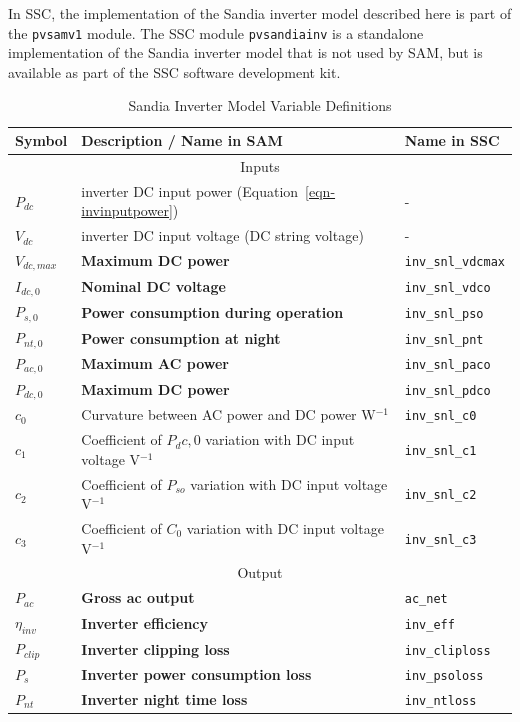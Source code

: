 \documentclass[12pt,letterpaper]{article}
\begin{document}
In SSC, the implementation of the Sandia inverter model described here is part of the \texttt{pvsamv1} module. The SSC module \texttt{pvsandiainv} is a standalone implementation of the Sandia inverter model that is not used by SAM, but is available as part of the SSC software development kit.

\begin{table}
\begin{center}
\caption{Sandia Inverter Model Variable Definitions}
\begin{tabular}{lll}
\midrule
Symbol & Description / \textbf{Name in SAM} & Name in SSC \\
\midrule
\multicolumn{3}{c}{Inputs}\\
$P_{dc}$ & inverter DC input power (Equation~\ref{eqn-invinputpower}) & - \\
$V_{dc}$ & inverter DC input voltage (DC string voltage) & - \\
$V_{dc,max}$ & \textbf{Maximum DC power} & \texttt{inv\_snl\_vdcmax} \\
$I_{dc,0}$ & \textbf{Nominal DC voltage} & \texttt{inv\_snl\_vdco} \\
$P_{s,0}$ & \textbf{Power consumption during operation} & \texttt{inv\_snl\_pso} \\
$P_{nt,0}$ & \textbf{Power consumption at night} & \texttt{inv\_snl\_pnt} \\
$P_{ac,0}$ & \textbf{Maximum AC power} & \texttt{inv\_snl\_paco} \\
$P_{dc,0}$ & \textbf{Maximum DC power} & \texttt{inv\_snl\_pdco} \\
$c_0$ & Curvature between AC power and DC power W$^{-1}$ & \texttt{inv\_snl\_c0} \\
$c_1$ & Coefficient of $P_dc,0$ variation with DC input voltage V$^{-1}$ &  \texttt{inv\_snl\_c1} \\
$c_2$ & Coefficient of $P_{so}$ variation with DC input voltage V$^{-1}$ &\texttt{inv\_snl\_c2} \\
$c_3$ & Coefficient of $C_0$ variation with DC input voltage V$^{-1}$ & \texttt{inv\_snl\_c3} \\
\midrule
\multicolumn{3}{c}{Output}\\
$P_{ac}$ & \textbf{Gross ac output} & \texttt{ac\_net} \\
$\eta_{inv}$ & \textbf{Inverter efficiency} & \texttt{inv\_eff}  \\
$P_{clip}$ & \textbf{Inverter clipping loss} & \texttt{inv\_cliploss}  \\
$P_{s}$ & \textbf{Inverter power consumption loss}& \texttt{inv\_psoloss}  \\
$P_{nt}$ & \textbf{Inverter night time loss}& \texttt{inv\_ntloss}  \\
\hline
\end{tabular}
\label{tab-sandiainvertervars}
\end{center}
\end{table}
\end{document}

